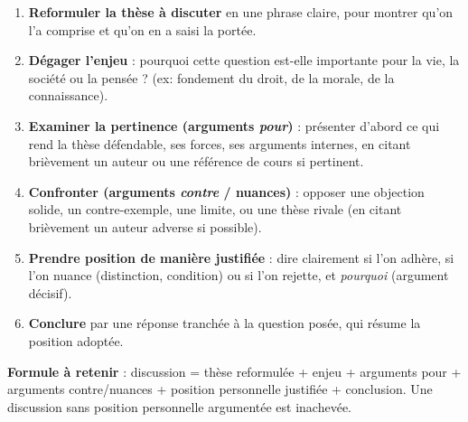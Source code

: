\documentclass[11pt]{article}
\begin{document}
\begin{methode}
\begin{enumerate}
\item \textbf{Reformuler la thèse à discuter} en une phrase claire, pour montrer qu'on l'a comprise et qu'on en a saisi la portée.
\item \textbf{Dégager l'enjeu} : pourquoi cette question est-elle importante pour la vie, la société ou la pensée ? (ex: fondement du droit, de la morale, de la connaissance).
\item \textbf{Examiner la pertinence (arguments \emph{pour})} : présenter d'abord ce qui rend la thèse défendable, ses forces, ses arguments internes, en citant brièvement un auteur ou une référence de cours si pertinent.
\item \textbf{Confronter (arguments \emph{contre} / nuances)} : opposer une objection solide, un contre-exemple, une limite, ou une thèse rivale (en citant brièvement un auteur adverse si possible).
\item \textbf{Prendre position de manière justifiée} : dire clairement si l'on adhère, si l'on nuance (distinction, condition) ou si l'on rejette, et \emph{pourquoi} (argument décisif).
\item \textbf{Conclure} par une réponse tranchée à la question posée, qui résume la position adoptée.
\end{enumerate}
\textbf{Formule à retenir} : discussion = thèse reformulée + enjeu + arguments pour + arguments contre/nuances + position personnelle justifiée + conclusion. Une discussion sans position personnelle argumentée est inachevée.
\end{methode}
\end{document}
